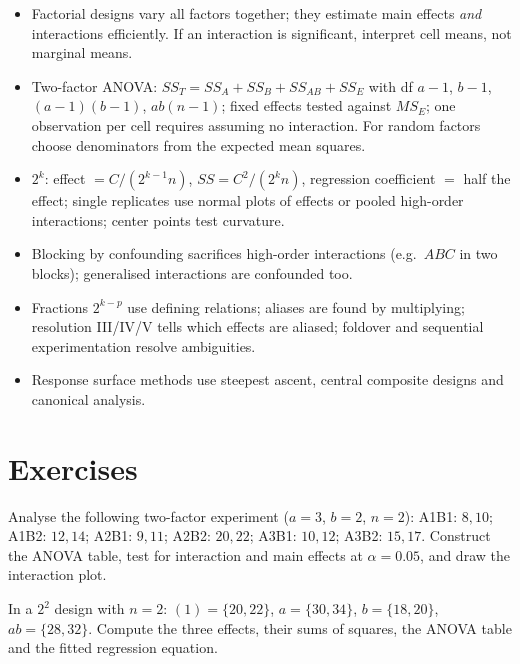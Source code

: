 \begin{summarybox}
\begin{itemize}
  \item Factorial designs vary all factors together; they estimate main effects \emph{and} interactions efficiently. If an interaction is significant, interpret cell means, not marginal means.
  \item Two-factor ANOVA: $SS_T=SS_A+SS_B+SS_{AB}+SS_E$ with df $a-1$, $b-1$, $(a-1)(b-1)$, $ab(n-1)$; fixed effects tested against $MS_E$; one observation per cell requires assuming no interaction. For random factors choose denominators from the expected mean squares.
  \item $2^k$: effect $=C/(2^{k-1}n)$, $SS=C^2/(2^kn)$, regression coefficient $=$ half the effect; single replicates use normal plots of effects or pooled high-order interactions; center points test curvature.
  \item Blocking by confounding sacrifices high-order interactions (e.g.\ $ABC$ in two blocks); generalised interactions are confounded too.
  \item Fractions $2^{k-p}$ use defining relations; aliases are found by multiplying; resolution III/IV/V tells which effects are aliased; foldover and sequential experimentation resolve ambiguities.
  \item Response surface methods use steepest ascent, central composite designs and canonical analysis.
\end{itemize}
\end{summarybox}

\section{Exercises}

\begin{exercise}
Analyse the following two-factor experiment ($a=3$, $b=2$, $n=2$): A1B1: $8,10$; A1B2: $12,14$; A2B1: $9,11$; A2B2: $20,22$; A3B1: $10,12$; A3B2: $15,17$. Construct the ANOVA table, test for interaction and main effects at $\alpha=0.05$, and draw the interaction plot.
\end{exercise}

\begin{exercise}
In a $2^2$ design with $n=2$: $(1)=\{20,22\}$, $a=\{30,34\}$, $b=\{18,20\}$, $ab=\{28,32\}$. Compute the three effects, their sums of squares, the ANOVA table and the fitted regression equation.
\end{exercise}

